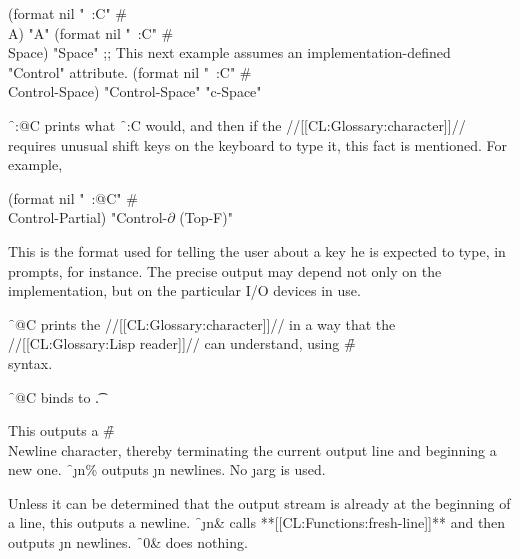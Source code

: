 \code
 (format nil "~:C" #\\A) \EV "A"
 (format nil "~:C" #\\Space) \EV "Space" ;; This next example assumes an implementation-defined "Control" attribute.
 (format nil "~:C" #\\Control-Space) \EV "Control-Space" \OV "c-Space" \endcode

\f{~:@C} prints what \f{~:C} would, and then if the //[[CL:Glossary:character]]// requires unusual shift keys on the keyboard to type it, this fact is mentioned.  For example,

\begingroup \def\Partial{$\partial$} \code
 (format nil "~:@C" #\\Control-Partial) \EV "Control-{\Partial} (Top-F)"   \endcode \endgroup

This is the format used for telling the user about a key he is expected to type, in prompts, for instance.  The precise output may depend not only on the implementation, but on the particular I/O devices in use.
                           

\f{~@C}  prints the //[[CL:Glossary:character]]// in a way that the //[[CL:Glossary:Lisp reader]]// can understand, using \f{\#\\} syntax.

 \f{~@C}  binds  to \t.

\endsubsubsection%

 

This outputs a \f{\#\\Newline} character, thereby terminating the current output line and beginning a new one. \f{~\j{n}\%} outputs \j{n} newlines. No \j{arg} is used.  

\endsubsubsection%

 

Unless it can be determined that the output stream is already at the beginning of a line, this outputs a newline. \f{~\j{n}\&} calls **[[CL:Functions:fresh-line]]** and then outputs \j{n} newlines. \f{~0\&} does nothing.

\endsubsubsection%

 

